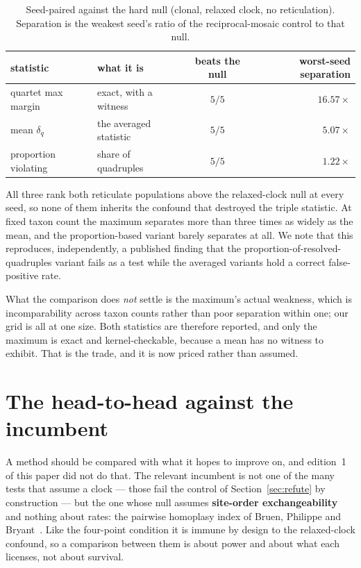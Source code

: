 \documentclass[11pt,a4paper]{article}
\theoremstyle{definition}
\theoremstyle{remark}
\begin{document}
\begin{table}[h]
\centering\small
\caption{Seed-paired against the hard null (clonal, relaxed clock, no
reticulation). Separation is the weakest seed's ratio of the reciprocal-mosaic
control to that null.}
\label{tab:maxmean}
\begin{tabular}{@{}llcr@{}}
\toprule
statistic & what it is & beats the null & worst-seed separation \\
\midrule
quartet max margin & exact, with a witness & $5/5$ & $\mathbf{16.57\times}$ \\
mean $\delta_q$ & the averaged statistic & $5/5$ & $5.07\times$ \\
proportion violating & share of quadruples & $5/5$ & $1.22\times$ \\
\bottomrule
\end{tabular}
\end{table}

All three rank both reticulate populations above the relaxed-clock null at every
seed, so none of them inherits the confound that destroyed the triple statistic.
At fixed taxon count the maximum separates more than three times as widely as the
mean, and the proportion-based variant barely separates at all. We note that this
reproduces, independently, a published finding that the proportion-of-resolved-%
quadruples variant fails as a test while the averaged variants hold a correct
false-positive rate.

What the comparison does \emph{not} settle is the maximum's actual weakness,
which is incomparability across taxon counts rather than poor separation within
one; our grid is all at one size. Both statistics are therefore reported, and
only the maximum is exact and kernel-checkable, because a mean has no witness to
exhibit. That is the trade, and it is now priced rather than assumed.

\section{The head-to-head against the incumbent}\label{sec:headtohead}

A method should be compared with what it hopes to improve on, and edition~1 of
this paper did not do that. The relevant incumbent is not one of the many tests
that assume a clock --- those fail the control of Section~\ref{sec:refute} by
construction --- but the one whose null assumes \textbf{site-order
exchangeability} and nothing about rates: the pairwise homoplasy index of Bruen,
Philippe and Bryant~\cite{bruen}. Like the four-point condition it is immune by
design to the relaxed-clock confound, so a comparison between them is about
power and about what each licenses, not about survival.
\end{document}
